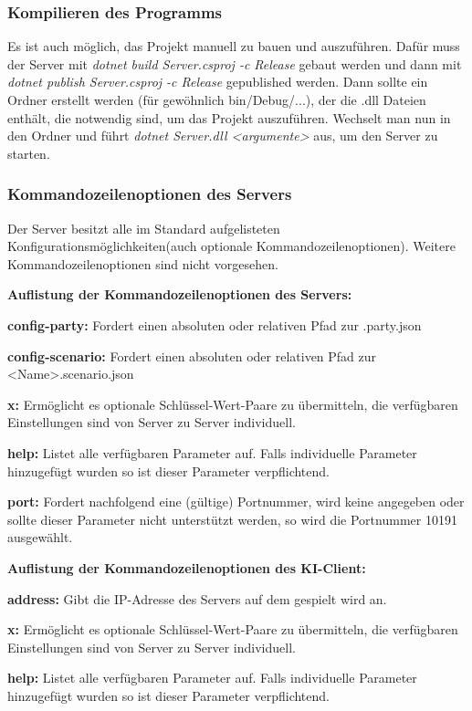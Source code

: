 \documentclass[12pt]{article}
\newcounter{fa}
\begin{document}
\subsubsection{Kompilieren des Programms}
Es ist auch möglich, das Projekt manuell zu bauen und auszuführen. Dafür muss der Server mit \textit{dotnet build Server.csproj -c Release} gebaut werden und dann mit \textit{dotnet publish Server.csproj -c Release} gepublished
werden. Dann sollte ein Ordner erstellt werden (für gewöhnlich bin/Debug/...), der die .dll Dateien enthält, die notwendig sind, um das Projekt auszuführen.
Wechselt man nun in den Ordner und führt \textit{dotnet Server.dll <argumente>} aus, um den Server zu starten.

\subsubsection{Kommandozeilenoptionen des Servers}
Der Server besitzt alle im Standard aufgelisteten Konfigurationsmöglichkeiten(auch optionale Kommandozeilenoptionen). Weitere Kommandozeilenoptionen sind nicht vorgesehen.

\textbf{Auflistung der Kommandozeilenoptionen des Servers:}

\textbf{config-party:} Fordert einen absoluten oder relativen Pfad zur .party.json

\textbf{config-scenario:} Fordert einen absoluten oder relativen Pfad zur <Name>.scenario.json

\textbf{x:} Ermöglicht es optionale Schlüssel-Wert-Paare zu übermitteln, die verfügbaren Einstellungen sind von
Server zu Server individuell.

\textbf{help:} Listet alle verfügbaren Parameter auf. Falls individuelle Parameter hinzugefügt wurden so ist dieser Parameter verpflichtend.

\textbf{port:} Fordert nachfolgend eine (gültige) Portnummer, wird keine angegeben oder sollte dieser Parameter
nicht unterstützt werden, so wird die Portnummer 10191 ausgewählt.

\textbf{Auflistung der Kommandozeilenoptionen des KI-Client:}

\textbf{address:} Gibt die IP-Adresse des Servers auf dem gespielt wird an.

\textbf{x:} Ermöglicht es optionale Schlüssel-Wert-Paare zu übermitteln, die verfügbaren Einstellungen sind von
Server zu Server individuell.

\textbf{help:} Listet alle verfügbaren Parameter auf. Falls individuelle Parameter hinzugefügt wurden so ist dieser Parameter verpflichtend.
\end{document}
